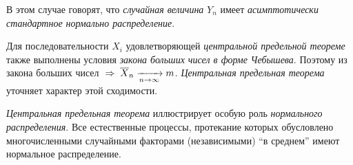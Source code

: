\begin{rem}
	В этом случае говорят, что \emph{случайная величина} $Y_n$ имеет \emph{асимптотически стандартное нормально распределение}.
\end{rem}
\begin{rem}
	Для последовательности $X_i$ удовлетворяющей \emph{центральной предельной теореме} также выполнены условия \emph{закона больших чисел в форме Чебышева}. Поэтому из закона больших чисел $\;\Rightarrow\; \overline{X}_n \xrightarrow[n\to\infty]{} m$. \emph{Центральная предельная теорема} уточняет характер этой сходимости.
\end{rem}
\begin{rem}
	\emph{Центральная предельная теорема} иллюстрирует особую роль \emph{нормального распределения}. Все естественные процессы, протекание которых обусловлено многочисленными случайными факторами (независимыми) ``в среднем'' имеют нормальное распределение.
\end{rem}

